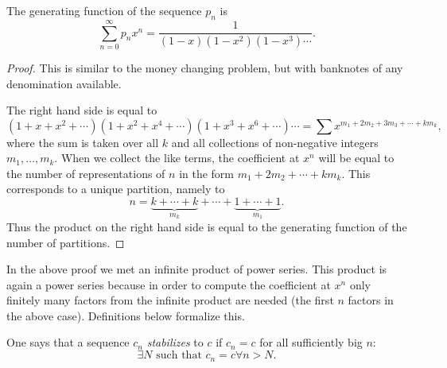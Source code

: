 \begin{page}
\setcounter{section}{3}
\setcounter{subsection}{4}
\setcounter{dfn}{5}
\label{portion:797}

\begin{thm}
The generating function of the sequence $p_n$ is
\[
\sum_{n=0}^\infty p_n x^n = \frac{1}{(1-x)(1-x^2)(1-x^3)\cdots}.
\]
\end{thm}

\end{page}

\begin{page}
\setcounter{section}{3}
\setcounter{subsection}{4}
\setcounter{dfn}{5}
\label{portion:798}

\begin{proof}
This is similar to the money changing problem, but with banknotes of any denomination available.

The right hand side is equal to
\[
(1+x+x^2+\cdots)(1+x^2+x^4+\cdots)(1+x^3+x^6+\cdots)\cdots = \sum x^{m_1 + 2m_2 + 3m_3 + \cdots + km_k},
\]
where the sum is taken over all $k$ and all collections of non-negative integers $m_1, \ldots, m_k$.
When we collect the like terms, the coefficient at $x^n$ will be equal to the number of representations of $n$ in the form
$m_1 + 2m_2 + \cdots + km_k$.
This corresponds to a unique partition, namely to
\[
n = \underbrace{k+\cdots+k}_{m_k} + \cdots + \underbrace{1+\cdots+1}_{m_1}.
\]
Thus the product on the right hand side is equal to the generating function of the number of partitions.
\end{proof}

In the above proof we met an infinite product of power series.
This product is again a power series because in order to compute the coefficient at $x^n$
only finitely many factors from the infinite product are needed (the first $n$ factors in the above case).
Definitions below formalize this.


\end{page}

\begin{page}
\setcounter{section}{3}
\setcounter{subsection}{4}
\setcounter{dfn}{6}
\label{portion:800}

\begin{dfn}
One says that a sequence $c_n$ \emph{stabilizes} to $c$ if $c_n = c$ for all sufficiently big $n$:
\[
\exists N \text{ such that } c_n = c \forall n > N.
\]
\end{dfn}

\end{page}

